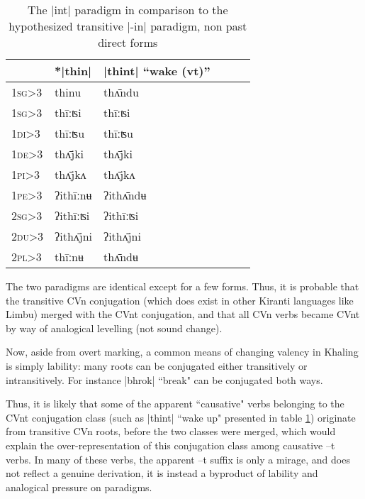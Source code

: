 \documentclass[oldfontcommands,oneside,a4paper,11pt]{article}
\newcommand{\ipa}[1]{{\phon #1}} %
\newcommand{\grise}[1]{\cellcolor{lightgray}\textbf{#1}}
\begin{document}
\begin{table}[h]
\caption{The |int| paradigm in comparison to the hypothesized transitive |-in| paradigm, non past direct forms} \label{tab:int} \centering
\begin{tabular}{llllll}
\toprule
\textsc{} &	*|thin|  &  	|thint| ``wake (vt)''  \\  		
\midrule
\textsc{1sg>3} &	\ipa{*thinu} \grise{}  &  	\ipa{thʌ̄ndu}  \\  		
\textsc{1sg>3} &	\ipa{thīːʦi}  &  	\ipa{thīːʦi}  \\  		
\textsc{1di>3} &	\ipa{thīːʦu}  &  	\ipa{thīːʦu}  \\  		
\textsc{1de>3} &	\ipa{thʌ̄jki}  &  	\ipa{thʌ̄jki}  \\  		
\textsc{1pi>3} &	\ipa{thʌ̄jkʌ}  &  	\ipa{thʌ̄jkʌ}  \\  		
\textsc{1pe>3} &	\ipa{*ʔithīːnʉ}\grise{}   &  	\ipa{ʔithʌ̄ndʉ}  \\  		
\textsc{2sg>3} &	\ipa{ʔithīːʦi}  &  	\ipa{ʔithīːʦi}  \\  		
\textsc{2du>3} &	\ipa{ʔithʌ̄jni}  &  	\ipa{ʔithʌ̄jni}  \\  		
\textsc{2pl>3} &	\ipa{*thīːnʉ}\grise{}   &  	\ipa{thʌ̄ndʉ}  \\  		
\bottomrule
\end{tabular}
\end{table}
The two paradigms are identical except for a few forms. Thus, it is probable that the transitive CVn conjugation (which does exist in other Kiranti languages like Limbu) merged with the CVnt conjugation, and that all CVn verbs became CVnt by way of analogical levelling (not sound change).

Now, aside from overt marking, a common means of changing valency in Khaling is simply lability: many roots can be conjugated either transitively or intransitively. For instance |bhrok| ``break" can be conjugated both ways. 


Thus, it is likely that some of the apparent ``causative" verbs belonging to the CVnt conjugation class (such as |thint| ``wake up" presented in table \ref{tab:int}) originate from transitive CVn roots, before the two classes were merged, which would explain the over-representation of this conjugation class among causative \ipa{--t} verbs. In many of these verbs, the apparent --t suffix is only a mirage, and does not reflect a genuine derivation, it is instead a byproduct of lability and analogical pressure on paradigms.
\end{document}
